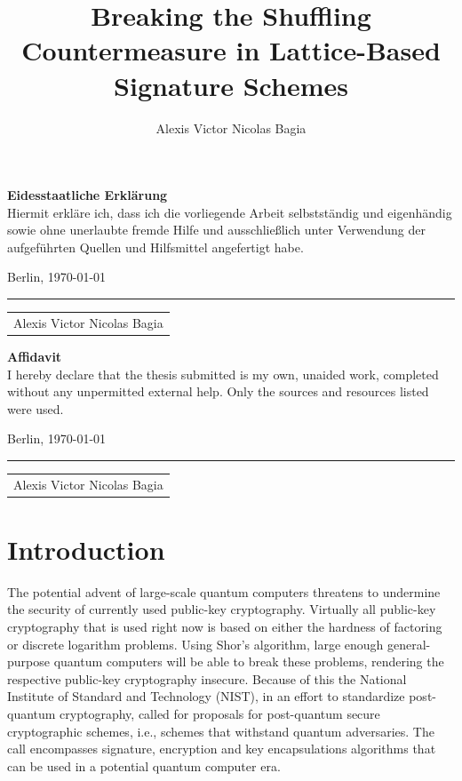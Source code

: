\documentclass[a4paper,titlepage]{article}
\title{Breaking the Shuffling Countermeasure in Lattice-Based Signature Schemes}
\author{Alexis Victor Nicolas Bagia}
\newcommand\namegroup[1]{%
   \begin{minipage}[t]{0.4\textwidth}
   \vspace*{1.5cm}  %
   \hrule
   \vspace{1mm} %
   \centering
   \begin{tabular}[t]{c}
   #1 
   \end{tabular}
   \end{minipage}}
\begin{document}
\maketitle


\null\vfill
{%
\noindent\textbf{Eidesstaatliche Erklärung}\\
Hiermit erkläre ich, dass ich die vorliegende Arbeit selbstständig und eigenhändig sowie ohne unerlaubte fremde Hilfe und ausschließlich unter Verwendung der aufgeführten Quellen und Hilfsmittel angefertigt habe.

\vspace{1em}
\noindent Berlin, \today

\namegroup{Alexis Victor Nicolas Bagia}

\vspace{5em}

\noindent\textbf{Affidavit}\\
I hereby declare that the thesis submitted is my own, unaided work, completed without any unpermitted external help. Only the sources and resources listed were used.

\vspace{1em}
\noindent Berlin, \today

\namegroup{Alexis Victor Nicolas Bagia}}
\null\vfill
\pagebreak




\pagebreak
{}

\section{Introduction}
The potential advent of large-scale quantum computers threatens to undermine the security of currently used public-key cryptography. Virtually all public-key cryptography that is used right now is based on either the hardness of factoring or discrete logarithm problems. Using Shor's algorithm, large enough general-purpose quantum computers will be able to break these problems, rendering the respective public-key cryptography insecure.
Because of this the National Institute of Standard and Technology (NIST), in an effort to standardize post-quantum  cryptography, called for proposals for post-quantum secure cryptographic schemes, i.e., schemes that withstand quantum adversaries. The call encompasses signature, encryption and key encapsulations algorithms that can be used in a potential quantum computer era.
\end{document}
